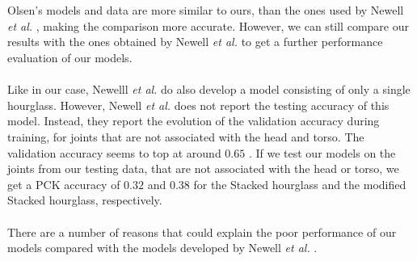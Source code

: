 \documentclass[./main.tex]{subfiles}
\begin{document}
\\
\\
Olsen's models and data are more similar to ours, than the ones used by Newell \textit{et al.} \cite{Newell}, making the comparison more accurate. However, we can still compare our results with the ones obtained by Newell \textit{et al.} \cite{Newell} to get a further performance evaluation of our models.
\\
\\
Like in our case, Newelll \textit{et al.} do also develop a model consisting of only a single hourglass. However, Newell \textit{et al.} does not report the testing accuracy of this model. Instead, they report the evolution of the validation accuracy during training, for joints that are not associated with the head and torso. The validation accuracy seems to top at around $0.65$ \cite{Newell}. If we test our models on the joints from our testing data, that are not associated with the head or torso, we get a PCK accuracy of $0.32$ and $0.38$ for the Stacked hourglass and the modified Stacked hourglass, respectively.
\\
\\
There are a number of reasons that could explain the poor performance of our models compared with the models developed by Newell \textit{et al.} \cite{Newell}. 
\end{document}
